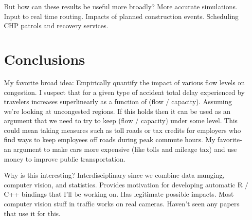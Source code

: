 \documentclass[12pt]{article}
\begin{document}
But how can these results be useful more broadly? More accurate
simulations. Input to real time routing. Impacts of planned construction
events. Scheduling CHP patrols and recovery services.

\section{Conclusions}


My favorite broad idea: Empirically quantify the impact of various flow levels on congestion.
I suspect that for a given type of accident total delay experienced by
travelers increases superlinearly as a function of (flow / capacity).
Assuming we're looking at uncongested regions. If this holds then it can be
used as an argument that we need to try to keep (flow / capacity) under
some level. This could mean taking measures such as toll roads or tax
credits for employers who find ways to keep employees off roads during peak
commute hours. My favorite- an argument to make cars more expensive (like
tolls and mileage tax) and use money to improve public transportation.

Why is this interesting? Interdisciplinary since we combine data munging,
computer vision, and statistics. Provides motivation for developing
automatic R / C++ bindings that I'll be working on. Has legitimate possible
impacts. Most computer vision stuff in traffic works on real cameras.
Haven't seen any papers that use it for this.

 


\end{document}
